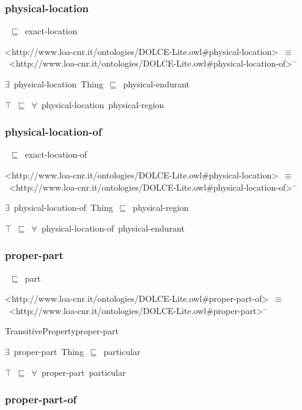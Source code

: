 \documentclass{article}
\begin{document}
\subsubsection*{physical-location}

~\ensuremath{\sqsubseteq}~exact-location

<http://www.loa-cnr.it/ontologies/DOLCE-Lite.owl#physical-location>~\ensuremath{\equiv}~<http://www.loa-cnr.it/ontologies/DOLCE-Lite.owl#physical-location-of>\ensuremath{^-}

\ensuremath{\exists}~physical-location~Thing~\ensuremath{\sqsubseteq}~physical-endurant

\ensuremath{\top}~\ensuremath{\sqsubseteq}~\ensuremath{\forall}~physical-location~physical-region

\subsubsection*{physical-location-of}

~\ensuremath{\sqsubseteq}~exact-location-of

<http://www.loa-cnr.it/ontologies/DOLCE-Lite.owl#physical-location>~\ensuremath{\equiv}~<http://www.loa-cnr.it/ontologies/DOLCE-Lite.owl#physical-location-of>\ensuremath{^-}

\ensuremath{\exists}~physical-location-of~Thing~\ensuremath{\sqsubseteq}~physical-region

\ensuremath{\top}~\ensuremath{\sqsubseteq}~\ensuremath{\forall}~physical-location-of~physical-endurant

\subsubsection*{proper-part}

~\ensuremath{\sqsubseteq}~part

<http://www.loa-cnr.it/ontologies/DOLCE-Lite.owl#proper-part-of>~\ensuremath{\equiv}~<http://www.loa-cnr.it/ontologies/DOLCE-Lite.owl#proper-part>\ensuremath{^-}

TransitivePropertyproper-part

\ensuremath{\exists}~proper-part~Thing~\ensuremath{\sqsubseteq}~particular

\ensuremath{\top}~\ensuremath{\sqsubseteq}~\ensuremath{\forall}~proper-part~particular

\subsubsection*{proper-part-of}
\end{document}
